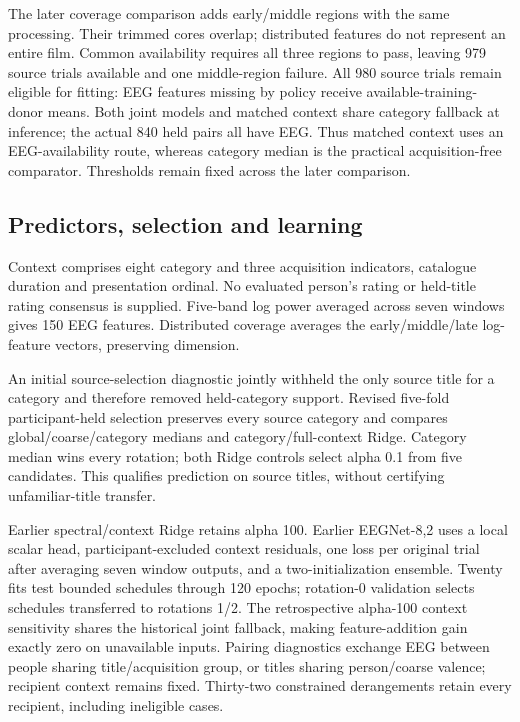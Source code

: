 \documentclass[10pt,letterpaper]{article}
\begin{document}
The later coverage comparison adds early/middle regions with the same processing. Their trimmed cores overlap; distributed features do not represent an entire film. Common availability requires all three regions to pass, leaving 979 source trials available and one middle-region failure. All 980 source trials remain eligible for fitting: EEG features missing by policy receive available-training-donor means. Both joint models and matched context share category fallback at inference; the actual 840 held pairs all have EEG. Thus matched context uses an EEG-availability route, whereas category median is the practical acquisition-free comparator. Thresholds remain fixed across the later comparison.

\subsection{Predictors, selection and learning}
Context comprises eight category and three acquisition indicators, catalogue duration and presentation ordinal. No evaluated person's rating or held-title rating consensus is supplied. Five-band log power averaged across seven windows gives 150 EEG features. Distributed coverage averages the early/middle/late log-feature vectors, preserving dimension.

An initial source-selection diagnostic jointly withheld the only source title for a category and therefore removed held-category support. Revised five-fold participant-held selection preserves every source category and compares global/coarse/category medians and category/full-context Ridge. Category median wins every rotation; both Ridge controls select alpha 0.1 from five candidates. This qualifies prediction on source titles, without certifying unfamiliar-title transfer.

Earlier spectral/context Ridge retains alpha 100. Earlier EEGNet-8,2 uses a local scalar head, participant-excluded context residuals, one loss per original trial after averaging seven window outputs, and a two-initialization ensemble. Twenty fits test bounded schedules through 120 epochs; rotation-0 validation selects schedules transferred to rotations 1/2. The retrospective alpha-100 context sensitivity shares the historical joint fallback, making feature-addition gain exactly zero on unavailable inputs. Pairing diagnostics exchange EEG between people sharing title/acquisition group, or titles sharing person/coarse valence; recipient context remains fixed. Thirty-two constrained derangements retain every recipient, including ineligible cases.
\end{document}
